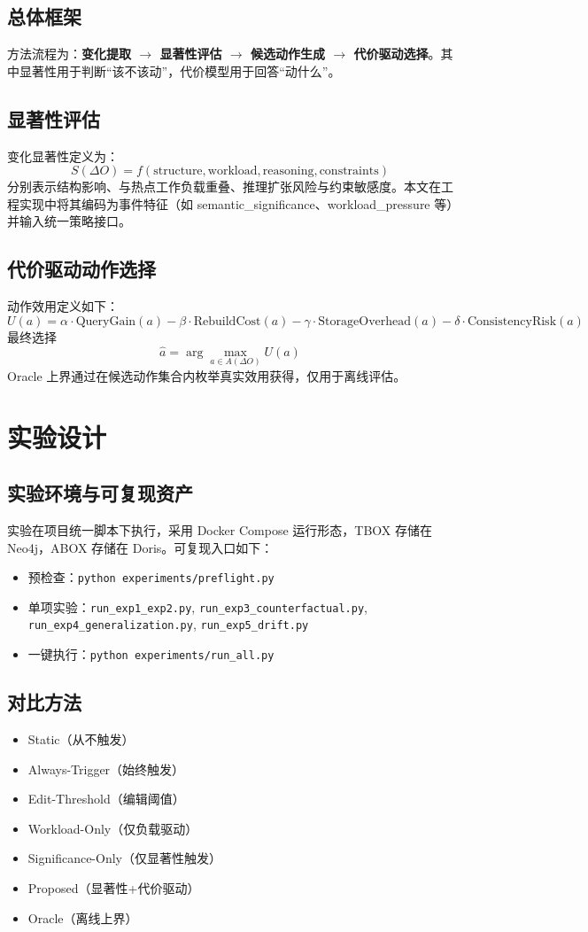 \documentclass[12pt,a4paper]{ctexart}
\begin{document}
\subsection{总体框架}
方法流程为：\textbf{变化提取 $\rightarrow$ 显著性评估 $\rightarrow$ 候选动作生成 $\rightarrow$ 代价驱动选择}。其中显著性用于判断“该不该动”，代价模型用于回答“动什么”。

\subsection{显著性评估}
变化显著性定义为：
\[
S(\Delta O)=f(\text{structure},\text{workload},\text{reasoning},\text{constraints})
\]
分别表示结构影响、与热点工作负载重叠、推理扩张风险与约束敏感度。本文在工程实现中将其编码为事件特征（如 semantic\_significance、workload\_pressure 等）并输入统一策略接口。

\subsection{代价驱动动作选择}
动作效用定义如下：
\[
U(a)=\alpha \cdot \mathrm{QueryGain}(a)-\beta \cdot \mathrm{RebuildCost}(a)-\gamma \cdot \mathrm{StorageOverhead}(a)-\delta \cdot \mathrm{ConsistencyRisk}(a)
\]
最终选择
\[
\hat a=\arg\max_{a\in A(\Delta O)}U(a)
\]
Oracle 上界通过在候选动作集合内枚举真实效用获得，仅用于离线评估。

\section{实验设计}
\subsection{实验环境与可复现资产}
实验在项目统一脚本下执行，采用 Docker Compose 运行形态，TBOX 存储在 Neo4j，ABOX 存储在 Doris。可复现入口如下：
\begin{itemize}
  \item 预检查：\texttt{python experiments/preflight.py}
  \item 单项实验：\texttt{run\_exp1\_exp2.py}, \texttt{run\_exp3\_counterfactual.py}, \texttt{run\_exp4\_generalization.py}, \texttt{run\_exp5\_drift.py}
  \item 一键执行：\texttt{python experiments/run\_all.py}
\end{itemize}

\subsection{对比方法}
\begin{itemize}
  \item Static（从不触发）
  \item Always-Trigger（始终触发）
  \item Edit-Threshold（编辑阈值）
  \item Workload-Only（仅负载驱动）
  \item Significance-Only（仅显著性触发）
  \item Proposed（显著性+代价驱动）
  \item Oracle（离线上界）
\end{itemize}
\end{document}
